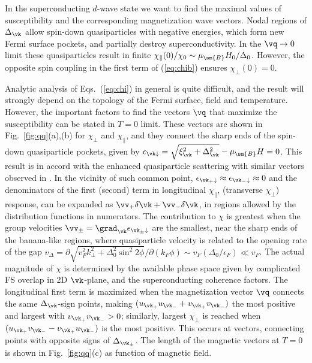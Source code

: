 \documentclass[aps,prl,twocolumn,showpacs,amsmath,amssymb]{revtex4-1}
\begin{document}
In the superconducting $d$-wave state we want to find the
maximal values of susceptibility and the corresponding 
magnetization wave vectors. 
Nodal regions of $\Delta_\vk$ allow 
spin-down quasiparticles with negative energies, which form new Fermi surface pockets,\cite{kato11_sc_afm} 
and partially destroy superconductivity. 
In the $\vq \to 0$ limit these quasiparticles result in finite 
$\chi_\parallel(0)/\chi_0 \sim \mu_\sm{B} H_0/\Delta_0$. However, the opposite spin coupling in 
the first term of (\ref{eq:chib}) ensures $\chi_\perp (0) = 0$.  
 
Analytic analysis of Eqs.~(\ref{eq:chi}) in general is quite difficult, 
and the result will strongly depend 
on the topology of the Fermi surface, field and temperature. 
However, the important factors to find the vectors $\vq$ that maximize the susceptibility 
can be stated in $T=0$ limit. 
These vectors are shown in Fig.~\ref{fig:qq}(a),(b) for $\chi_\perp$ and $\chi_\parallel$,  
and they connect the sharp ends of the spin-down quasiparticle pockets, given by 
$\epsilon_{\vk\downarrow}=\sqrt{\xi_\vk^2 + \Delta_\vk^2}-\mu_\sm{B} H=0$. 
This result is in accord with the enhanced quasiparticle scattering with similar vectors 
observed in \cite{McElroy03_qp_BSCCO}. 
In the vicinity of such common point, 
$\epsilon_{\vk_+\downarrow} \approx \epsilon_{\vk_-\downarrow} \approx 0$ and the 
denominators of the first (second)  term in longitudinal $\chi_\parallel$, 
(transverse $\chi_\perp$) response, can be 
expanded as $\vv_+ \delta\vk + \vv_-\delta\vk$, in regions allowed by the distribution 
functions in numerators. The contribution to $\chi$ is greatest %
when the group velocities $\vv_\pm = \grad_\vk \epsilon_{\vk_\pm \downarrow}$ are the 
smallest, \ie near the sharp ends of the banana-like regions, where quasiparticle 
velocity is related to the opening rate of the gap 
$v_\Delta = \partial \sqrt{v_F^2k_\perp^2 + \Delta_0^2 \sin^2 2\phi} / \partial (k_F \phi)
\sim v_F (\Delta_0/\epsilon_F) \ll v_F$. 
The actual magnitude of $\chi$ is determined by the available phase space given by 
complicated FS overlap in 2D $\vk$-plane, 
and the superconducting coherence factors.  
The longitudinal first term is maximized when 
the magnetization vector $\vq$ connects the same $\Delta_\vk$-sign 
points, making 
$ ( u_{\vk_+}u_{\vk_-}+v_{\vk_+}v_{\vk_-} ) $ 
the most positive and largest with $v_{\vk_+}v_{\vk_-}>0$; 
similarly, largest $\chi_\perp$ is reached when $ ( u_{\vk_+}v_{\vk_-}-v_{\vk_+}u_{\vk_-} ) $
is the most positive. This occurs at vectors, connecting points with 
opposite signs of $\Delta_{\vk_\pm}$. 
The length of the magnetic vectors at $T=0$ 
is shown in Fig.~\ref{fig:qq}(c) as function of magnetic field.
\end{document}
